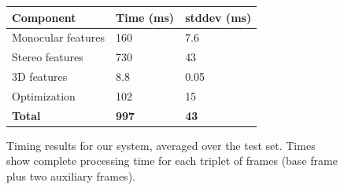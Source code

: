\begin{figure}[tb]
  \centering
  \begin{tabular}{@{}lp{2.1cm}p{1.8cm}@{}}
    \toprule
    Component & Time (ms) & stddev (ms) \\
    \midrule
    Monocular features & 160 & 7.6 \\
    Stereo features & 730 & 43 \\
    3D features & 8.8 & 0.05 \\
    Optimization & 102 & 15 \\
    \textbf{Total} & \textbf{997} & \textbf{43} \\
    \bottomrule
  \end{tabular}
  \vspace{0.2cm}
  \caption{Timing results for our system, averaged over the test
    set. Times show complete processing time for each triplet of
    frames (base frame plus two auxiliary frames).}
  \label{fig:timing}
\end{figure}

{\small


}
